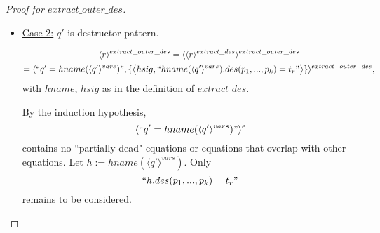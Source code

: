 \documentclass[11pt]{article} %
\begin{document}
\begin{proof}[Proof for $extract\_outer\_des$]
\begin{itemize}
\begin{itemize}
If it is $n > 0$, the function names of $q_{\epsilon_2}, ..., q_{\epsilon_n}$, and $q_\zeta$ aren't declared in $prg$, other than that of $t_p$, thus it cannot match these copatterns. For the remaining copattern, $q_{\epsilon_1} < q_{r^*}$, consider the relevant input fragment of $extract\_helpers(extract\_outer\_des)$. (TODO: this fragment has to be different from the current for this to work: roughly, for any function def. with destructors: every pattern in a lhs function call needs to be replaced (``split") with its most specific counterpart appearing anywhere in the function def.) The pattern arguments of the function call of $q_{r^*}$ are the most specific of their form appearing in the function definition. This is also the case with $q_{\epsilon_1}$ and the transformed function definition. But, $q'$ is also a prefix of $q_{r^*}$, and thus, for the same reason, its pattern arguments are also the most specific appearing in the function definition. When $t_p$ matches both $q'$ and $q_{\epsilon_1}$, they are both the most specific of the form that $t_p$ can match, and thus they are the same.

If, otherwise $n = 0$, it is $\zeta = r$. When $t$ matched both $r$ and $r^*$, $prg$ wouldn't be deterministic, contrary to assumption.

\item \underline{Case 2:} $q'$ is destructor pattern.

\begin{multline*}
\langle r \rangle^{extract\_outer\_des} = \langle \langle r \rangle^{extract\_des} \rangle^{extract\_outer\_des}\\
= \langle `` q' = hname(\langle q' \rangle^{vars}) ", \{\big\langle hsig, `` hname(\langle q' \rangle^{vars}).des(p_1, ..., p_k) = t_r " \big\rangle \} \rangle^{extract\_outer\_des},
\end{multline*}
with $hname$, $hsig$ as in the definition of $extract\_des$.

By the induction hypothesis,
\begin{equation*}
\langle `` q' = hname(\langle q' \rangle^{vars}) " \rangle^e
\end{equation*}
contains no ``partially dead" equations or equations that overlap with other equations. Let $h := hname(\langle q' \rangle^{vars})$. Only
\begin{equation*}
`` h.des(p_1, ..., p_k) = t_r "
\end{equation*}
remains to be considered. 


\end{itemize}
\end{itemize}
\end{proof}
\end{document}
